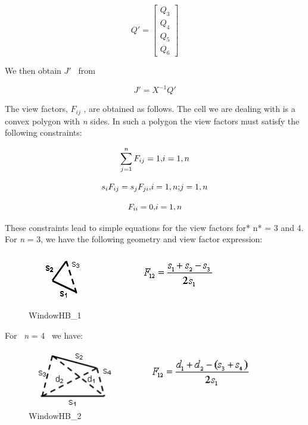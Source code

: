 \begin{equation}
Q' = \left[ \begin{array}{c}
    Q_3 \\
    Q_4 \\
    Q_5 \\
    Q_6 \end{array} \right]
\end{equation}

We then obtain \(J'\) ~from

\begin{equation}
J' = {X^{ - 1}}Q'
\end{equation}

The view factors, \({F_{ij}}\) , are obtained as follows. The cell we are dealing with is a convex polygon with \emph{n} sides. In such a polygon the view factors must satisfy the following constraints:

\begin{equation}
\sum\limits_{j = 1}^n {{F_{ij}} = 1{\rm{,  }}i = 1,n}
\end{equation}

\begin{equation}
{s_i}{F_{ij}} = {s_j}{F_{ji}}{\rm{,  }}i = 1,n{\rm{;  }}j = 1,n
\end{equation}

\begin{equation}
{F_{ii}} = 0{\rm{,  }}i = 1,n
\end{equation}

These constraints lead to simple equations for the view factors for* n* = 3 and 4. For \emph{n} = 3, we have the following geometry and view factor expression:

\begin{figure}[htbp]
\centering
\includegraphics{media/image1059.png}
\caption{WindowHB\_1}
\end{figure}

For~ \emph{n} = 4~ we have:

\begin{figure}[htbp]
\centering
\includegraphics{media/image1060.png}
\caption{WindowHB\_2}
\end{figure}

